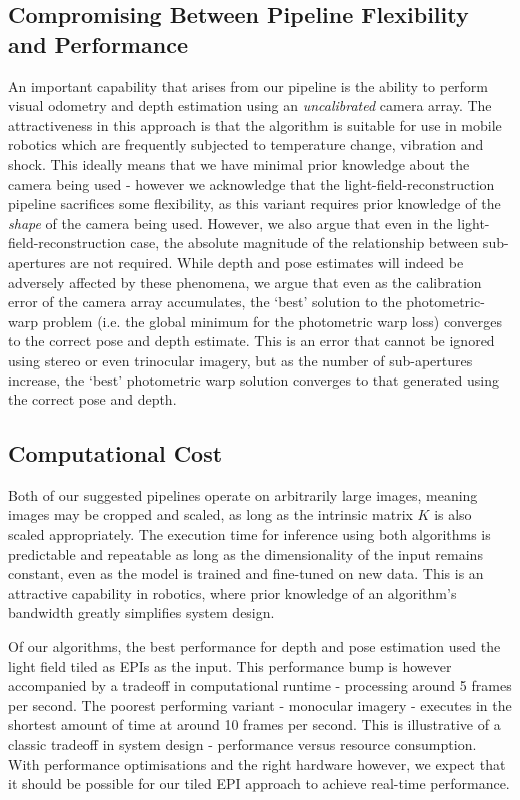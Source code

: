 \subsection{Compromising Between Pipeline Flexibility and Performance}
An important capability that arises from our pipeline is the ability to perform visual odometry and depth estimation using an \textit{uncalibrated} camera array. The attractiveness in this approach is that the algorithm is suitable for use in mobile robotics which are frequently subjected to temperature change, vibration and shock. This ideally means that we have minimal prior knowledge about the camera being used - however we acknowledge that the light-field-reconstruction pipeline sacrifices some flexibility, as this variant requires prior knowledge of the \textit{shape} of the camera being used. However, we also argue that even in the light-field-reconstruction case, the absolute magnitude of the relationship between sub-apertures are not required. While depth and pose estimates will indeed be adversely affected by these phenomena, we argue that even as the calibration error of the camera array accumulates, the `best' solution to the photometric-warp problem (i.e. the global minimum for the photometric warp loss) converges to the correct pose and depth estimate. This is an error that cannot be ignored using stereo or even trinocular imagery, but as the number of sub-apertures increase, the `best' photometric warp solution converges to that generated using the correct pose and depth. 

\subsection{Computational Cost}
Both of our suggested pipelines operate on arbitrarily large images, meaning images may be cropped and scaled, as long as the intrinsic matrix $K$ is also scaled appropriately. The execution time for inference using both algorithms is predictable and repeatable as long as the dimensionality of the input remains constant, even as the model is trained and fine-tuned on new data. This is an attractive capability in robotics, where prior knowledge of an algorithm's bandwidth greatly simplifies system design. 

Of our algorithms, the best performance for depth and pose estimation used the light field tiled as EPIs as the input. This performance bump is however accompanied by a tradeoff in computational runtime - processing around 5 frames per second. The poorest performing variant - monocular imagery - executes in the shortest amount of time at around 10 frames per second. This is illustrative of a classic tradeoff in system design - performance versus resource consumption. With performance optimisations and the right hardware however, we expect that it should be possible for our tiled EPI approach to achieve real-time performance. 


